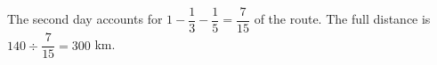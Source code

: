 The second day accounts for $1-\dfrac{1}{3}-\dfrac{1}{5}=\dfrac{7}{15}$ of the route. The full distance is $140\div\dfrac{7}{15}=\boxed{300}$ km.
